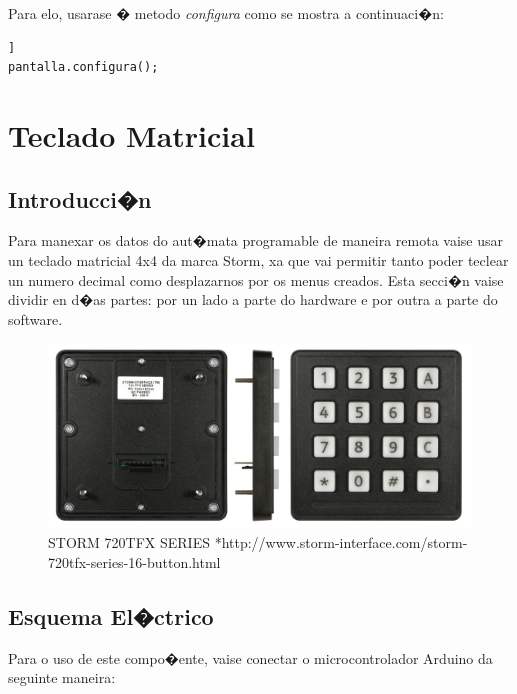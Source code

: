 \documentclass[11pt,twoside]{book}
\begin{document}
Para elo, usarase � metodo \textit{configura} como se mostra a continuaci�n:
\begin{lstlisting}] 
pantalla.configura();
\end{lstlisting}


\chapter{Teclado Matricial}

\section{Introducci�n}

Para manexar os datos do aut�mata programable de maneira remota vaise usar un teclado matricial 4x4 da marca Storm, xa que vai permitir tanto poder teclear un numero decimal como desplazarnos por os menus creados. Esta secci�n vaise dividir en d�as partes: por un lado a parte do hardware e por outra a parte do software.

\begin{figure}[H]
	\begin{center}
		\includegraphics[width=12cm]{images/teclado_storm.jpg}
	\end{center}
	\caption{STORM 720TFX SERIES *http://www.storm-interface.com/storm-720tfx-series-16-button.html}
	\label{fig:TecladoStorm}
\end{figure}

\section{Esquema El�ctrico}

Para o uso de este compo�ente, vaise conectar o microcontrolador Arduino da seguinte maneira:
\end{document}
